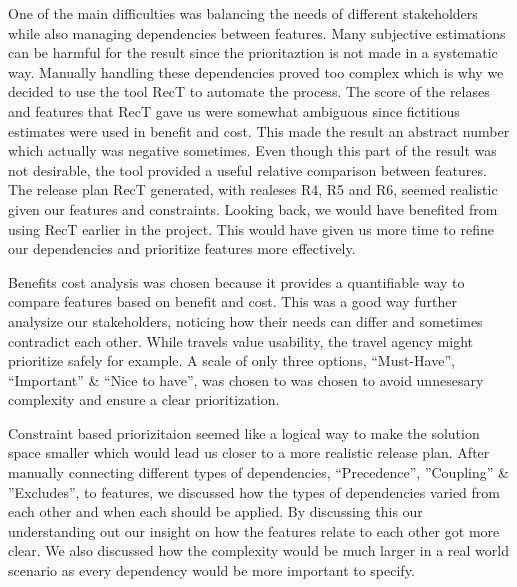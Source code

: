 One of the main difficulties was balancing the needs of different stakeholders while also managing dependencies between features. Many subjective estimations can be harmful for the result since the prioritaztion is not made in a systematic way. Manually handling these dependencies proved too complex which is why  we decided to use the tool RecT to automate the process. The score of the relases and features that RecT gave us were somewhat ambiguous since fictitious estimates were used in benefit and cost. This made the result an abstract number which actually was negative sometimes. Even though this part of the result was not desirable, the tool provided a useful relative comparison between features. The release plan RecT generated, with realeses R4, R5 and R6, seemed realistic given our features and constraints. Looking back, we would have benefited from using RecT earlier in the project. This would have given us more time to refine our dependencies and prioritize features more effectively. 

Benefits cost analysis was chosen because it provides a quantifiable way to compare features based on benefit and cost. This was a good way further analysize our stakeholders, noticing how their needs can differ and sometimes contradict each other. While travels value usability, the travel agency might prioritize safely for example. A scale of only three options, “Must-Have”, “Important” & “Nice to have”, was chosen to was chosen to avoid unnesesary complexity and ensure a clear prioritization.

Constraint based priorizitaion seemed like a logical way to make the solution space smaller which would lead us closer to a more realistic release plan. After manually connecting different types of dependencies, “Precedence”, ”Coupling” & ”Excludes”, to features, we discussed how the types of dependencies varied from each other and when each should be applied. By discussing this our understanding out our insight on how the features relate to each other got more clear. We also discussed how the complexity would be much larger in a real world scenario as every dependency would be more important to specify. 
